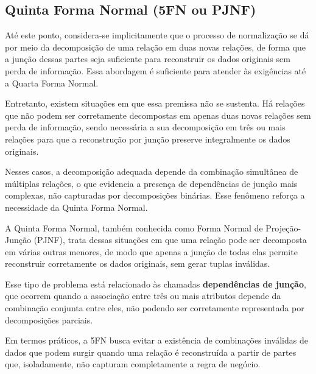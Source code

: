 \subsection{Quinta Forma Normal (5FN ou PJNF)}

Até este ponto, considera-se implicitamente que o processo de normalização se dá por meio da decomposição de uma relação em duas novas relações, de forma que a junção dessas partes seja suficiente para reconstruir os dados originais sem perda de informação. Essa abordagem é suficiente para atender às exigências até a Quarta Forma Normal.

Entretanto, existem situações em que essa premissa não se sustenta. Há relações que não podem ser corretamente decompostas em apenas duas novas relações sem perda de informação, sendo necessária a sua decomposição em três ou mais relações para que a reconstrução por junção preserve integralmente os dados originais.

Nesses casos, a decomposição adequada depende da combinação simultânea de múltiplas relações, o que evidencia a presença de dependências de junção mais complexas, não capturadas por decomposições binárias. Esse fenômeno reforça a necessidade da Quinta Forma Normal.

A Quinta Forma Normal, também conhecida como Forma Normal de Projeção-Junção (PJNF), trata dessas situações em que uma relação pode ser decomposta em várias outras menores, de modo que apenas a junção de todas elas permite reconstruir corretamente os dados originais, sem gerar tuplas inválidas.

Esse tipo de problema está relacionado às chamadas \textbf{dependências de junção}, que ocorrem quando a associação entre três ou mais atributos depende da combinação conjunta entre eles, não podendo ser corretamente representada por decomposições parciais.

Em termos práticos, a 5FN busca evitar a existência de combinações inválidas de dados que podem surgir quando uma relação é reconstruída a partir de partes que, isoladamente, não capturam completamente a regra de negócio.

